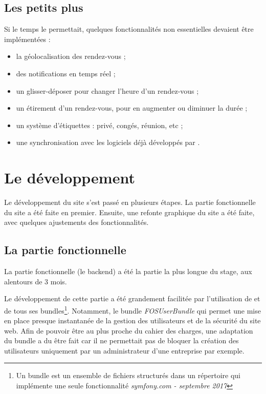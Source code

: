 \documentclass[a4paper, 11pt]{report}
\begin{document}
    \subsection{Les petits plus}
    Si le temps le permettait, quelques fonctionnalités non essentielles devaient être implémentées :
    \begin{itemize}
        \item la géolocalisation des rendez-vous ;
        \item des notifications en temps réel ;
        \item un glisser-déposer pour changer l'heure d'un rendez-vous ;
        \item un étirement d'un rendez-vous, pour en augmenter ou diminuer la durée ;
        \item un système d'étiquettes : privé, congés, réunion, etc ;
        \item une synchronisation avec les logiciels déjà développés par \lgk.
    \end{itemize}

\section{Le développement}
Le développement du site \agenda s'est passé en plusieurs étapes. La partie fonctionnelle du site a été faite en premier. Ensuite, une refonte graphique du site a été faite, avec quelques ajustements des fonctionnalités.
    \subsection{La partie fonctionnelle}
    La partie fonctionnelle (le backend) a été la partie la plus longue du stage, aux alentours de 3 mois.

    Le développement de cette partie a été grandement facilitée par l'utilisation de \symfony et de tous ses bundles\footnote{Un bundle est un ensemble de fichiers structurés dans un répertoire qui implémente une seule fonctionnalité \textit{symfony.com - septembre 2017}}. Notamment, le bundle \textit{FOSUserBundle} qui permet une mise en place presque instantanée de la gestion des utilisateurs et de la sécurité du site web. Afin de pouvoir être au plus proche du cahier des charges, une adaptation du bundle a du être fait car il ne permettait pas de bloquer la création des utilisateurs uniquement par un administrateur d'une entreprise par exemple.
\end{document}
